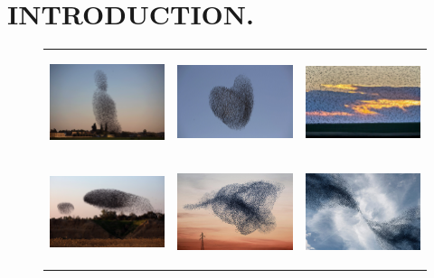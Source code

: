 \section{INTRODUCTION.}
%
\begin{figure}[tb!]
	\centering
	\begin{tabular}{ccc} 
		\includegraphics[height=8em,width=10em]{figures/migrating_starlings.jpg} 
		&
		\includegraphics[height=8em,width=10em]{figures/roosting.jpg} 
		& 
		\includegraphics[height=8em,width=10em]{figures/starlings_fly.jpg} 
		 \\	
		\includegraphics[height=8em,width=10em]{figures/starlings_split.jpg}
		&
		\includegraphics[height=8em,width=10em]{figures/starlings_tube.jpg} 
		&
		\includegraphics[height=8em,width=10em]{figures/starlings_funnel.jpg}

\end{tabular}
\end{figure}
